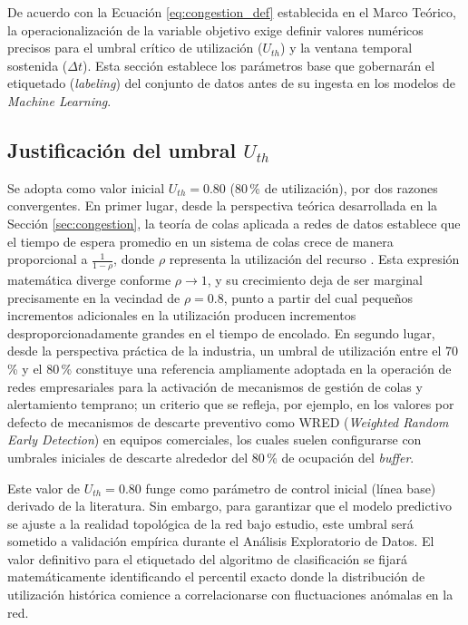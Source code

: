 \documentclass[12pt]{report}
\begin{document}
De acuerdo con la Ecuación \ref{eq:congestion_def} establecida en el Marco Teórico, la operacionalización de la variable objetivo exige definir valores numéricos precisos para el umbral crítico de utilización ($U_{th}$) y la ventana temporal sostenida ($\Delta t$). Esta sección establece los parámetros base que gobernarán el etiquetado (\textit{labeling}) del conjunto de datos antes de su ingesta en los modelos de \textit{Machine Learning}.

\subsection*{Justificación del umbral $U_{th}$}

Se adopta como valor inicial $U_{th} = 0.80$ (80\,\% de utilización), por dos razones convergentes. En primer lugar, desde la perspectiva teórica desarrollada en la Sección \ref{sec:congestion}, la teoría de colas aplicada a redes de datos establece que el tiempo de espera promedio en un sistema de colas crece de manera proporcional a $\frac{1}{1-\rho}$, donde $\rho$ representa la utilización del recurso \cite{kleinrock1976}. Esta expresión matemática diverge conforme $\rho \to 1$, 
y su crecimiento deja de ser marginal precisamente en la vecindad de $\rho = 0.8$, punto a partir del cual pequeños incrementos adicionales en la utilización producen incrementos desproporcionadamente grandes en el tiempo de encolado. En segundo lugar, desde la perspectiva práctica de la industria, un umbral de utilización entre el 70\,\% y el 80\,\% constituye una referencia ampliamente adoptada en la operación de redes empresariales para la activación de mecanismos de gestión de 
colas y alertamiento temprano; un criterio que se refleja, por ejemplo, en los valores por defecto de mecanismos de descarte preventivo como WRED (\textit{Weighted Random Early Detection}) en equipos comerciales, los cuales suelen configurarse con umbrales iniciales de descarte alrededor del 80\,\% de ocupación del \textit{buffer}.

Este valor de $U_{th} = 0.80$ funge como parámetro de control inicial (línea base) derivado de la literatura. Sin embargo, para garantizar que el modelo predictivo se ajuste a la realidad topológica de la red bajo estudio, este umbral será sometido a validación empírica durante el Análisis Exploratorio de Datos. El valor definitivo para el etiquetado del algoritmo de clasificación se fijará matemáticamente identificando el percentil exacto donde la distribución de utilización histórica 
comience a correlacionarse con fluctuaciones anómalas en la red.
\end{document}
